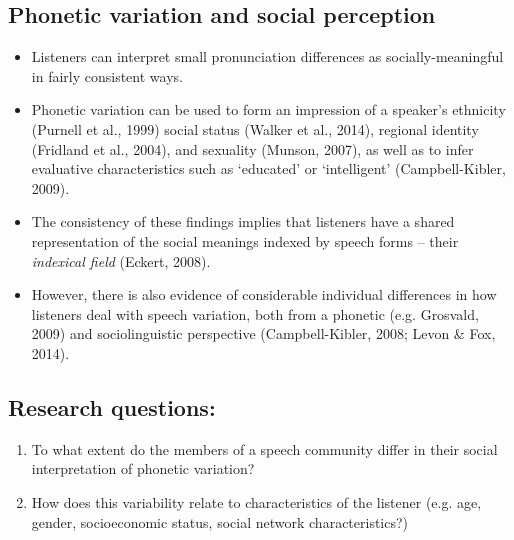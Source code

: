 \documentclass[a0,portrait]{a0poster}
\begin{document}
\begin{multicols}{4}							%
\raggedcolumns							%

\section*{Phonetic variation and social perception}
\begin{itemize}

\item{Listeners can interpret small pronunciation differences as socially-meaningful in fairly consistent ways.} 

\item{Phonetic variation can be used to form an impression of a speaker's ethnicity (Purnell et al., 1999) social status (Walker et al., 2014), regional identity (Fridland et al., 2004), and sexuality (Munson, 2007), as well as to infer evaluative characteristics such as `educated' or `intelligent' (Campbell-Kibler, 2009).}

\item{The consistency of these findings implies that listeners have a shared
representation of the social meanings indexed by speech forms -- their
\textit{indexical field} (Eckert, 2008).}

\item{However, there is also evidence of considerable individual differences in how listeners deal with speech variation, both from a phonetic (e.g. Grosvald, 2009) and sociolinguistic perspective (Campbell-Kibler, 2008; Levon \& Fox, 2014).}


\end{itemize}
\vspace*{-1cm}
\subsection*{Research questions:}
\begin{enumerate}
\item{To what extent do the members of a speech community differ in their social interpretation of phonetic variation?}

\item{How does this variability relate to characteristics of the listener (e.g. age, gender, socioeconomic status, social network characteristics?)}
\end{enumerate}
\vspace*{-1cm}



\end{multicols}
\end{document}

